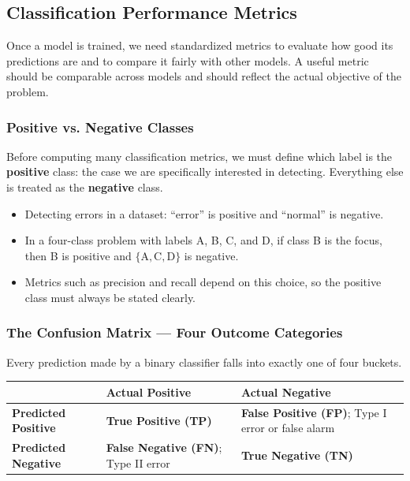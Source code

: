 \documentclass[12pt,openany]{book}
\begin{document}
\subsection{Classification Performance Metrics}

Once a model is trained, we need standardized metrics to evaluate how good its predictions are and to compare it fairly with other models. A useful metric should be comparable across models and should reflect the actual objective of the problem.

\subsubsection{Positive vs. Negative Classes}

Before computing many classification metrics, we must define which label is the \textbf{positive} class: the case we are specifically interested in detecting. Everything else is treated as the \textbf{negative} class.

\begin{itemize}[leftmargin=*]
    \item Detecting errors in a dataset: ``error'' is positive and ``normal'' is negative.
    \item In a four-class problem with labels A, B, C, and D, if class B is the focus, then B is positive and \(\{\text{A},\text{C},\text{D}\}\) is negative.
    \item Metrics such as precision and recall depend on this choice, so the positive class must always be stated clearly.
\end{itemize}

\subsubsection{The Confusion Matrix --- Four Outcome Categories}

Every prediction made by a binary classifier falls into exactly one of four buckets.

\begin{center}
\begin{tabular}{|L{0.22\textwidth}|L{0.32\textwidth}|L{0.32\textwidth}|}
\hline
 & \textbf{Actual Positive} & \textbf{Actual Negative} \\
\hline
\textbf{Predicted Positive} & \textbf{True Positive (TP)} & \textbf{False Positive (FP)}; Type I error or false alarm \\
\hline
\textbf{Predicted Negative} & \textbf{False Negative (FN)}; Type II error & \textbf{True Negative (TN)} \\
\hline
\end{tabular}
\end{center}
\end{document}
